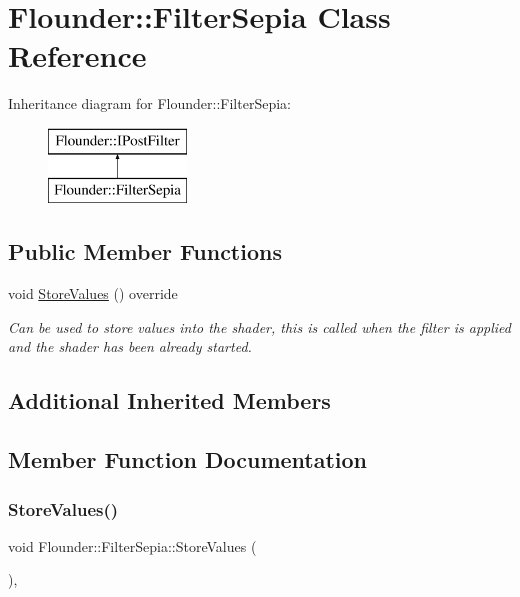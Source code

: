 \hypertarget{class_flounder_1_1_filter_sepia}{}\section{Flounder\+:\+:Filter\+Sepia Class Reference}
\label{class_flounder_1_1_filter_sepia}
Inheritance diagram for Flounder\+:\+:Filter\+Sepia\+:\begin{figure}[H]
\begin{center}
\leavevmode
\includegraphics[height=2.000000cm]{class_flounder_1_1_filter_sepia}
\end{center}
\end{figure}
\subsection*{Public Member Functions}
\begin{DoxyCompactItemize}
\item 
void \hyperlink{class_flounder_1_1_filter_sepia_a8c0aaa5c7835787c8418b51def1f5bda}{Store\+Values} () override
\begin{DoxyCompactList}\small\item\em Can be used to store values into the shader, this is called when the filter is applied and the shader has been already started. \end{DoxyCompactList}\end{DoxyCompactItemize}
\subsection*{Additional Inherited Members}


\subsection{Member Function Documentation}
\mbox{\label{class_flounder_1_1_filter_sepia_a8c0aaa5c7835787c8418b51def1f5bda}} 
\subsubsection{\texorpdfstring{Store\+Values()}{StoreValues()}}
{\footnotesize\ttfamily void Flounder\+::\+Filter\+Sepia\+::\+Store\+Values (\begin{DoxyParamCaption}{ }\end{DoxyParamCaption})\hspace{0.3cm}{\ttfamily [override]}, {\ttfamily [virtual]}}



